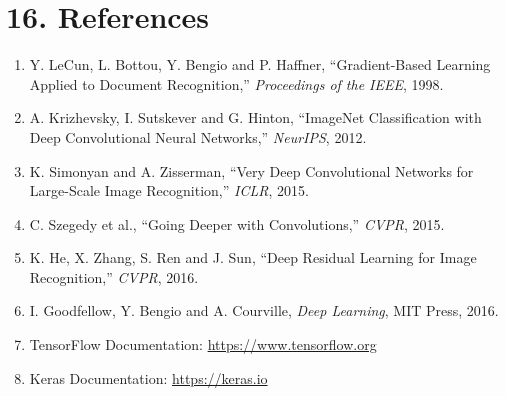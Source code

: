 \documentclass[11pt]{article}
\begin{document}

\section*{16. References}

\begin{enumerate}
\item Y. LeCun, L. Bottou, Y. Bengio and P. Haffner, ``Gradient-Based Learning Applied to Document Recognition,'' \emph{Proceedings of the IEEE}, 1998.
\item A. Krizhevsky, I. Sutskever and G. Hinton, ``ImageNet Classification with Deep Convolutional Neural Networks,'' \emph{NeurIPS}, 2012.
\item K. Simonyan and A. Zisserman, ``Very Deep Convolutional Networks for Large-Scale Image Recognition,'' \emph{ICLR}, 2015.
\item C. Szegedy et al., ``Going Deeper with Convolutions,'' \emph{CVPR}, 2015.
\item K. He, X. Zhang, S. Ren and J. Sun, ``Deep Residual Learning for Image Recognition,'' \emph{CVPR}, 2016.
\item I. Goodfellow, Y. Bengio and A. Courville, \emph{Deep Learning}, MIT Press, 2016.
\item TensorFlow Documentation: \url{https://www.tensorflow.org}
\item Keras Documentation: \url{https://keras.io}
\end{enumerate}
\end{document}
